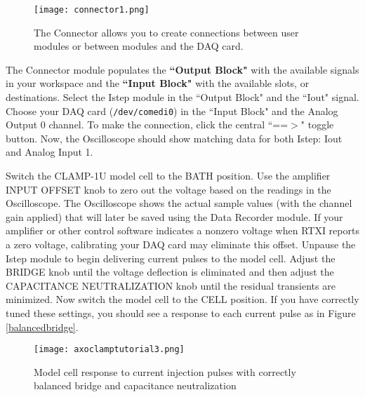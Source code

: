 \begin{figure}[h]
\begin{center}
\texttt{[image: connector1.png]} 
\caption[Connector]{The Connector allows you to create connections between user modules or between modules and the DAQ card.} 
\end{center}
\end{figure}

The Connector module populates the \textbf{``Output Block"} with the available signals in your workspace and the \textbf{``Input Block"} with the available slots, or destinations. Select the Istep module in the ``Output Block" and the ``Iout" signal. Choose your DAQ card (\texttt{/dev/comedi0}) in the ``Input Block" and the Analog Output 0 channel. To make the connection, click the central ``==$>$" toggle button. Now, the Oscilloscope should show matching data for both Istep: Iout and Analog Input 1.

\vspace{1cm}
Switch the CLAMP-1U model cell to the BATH position. Use the amplifier INPUT OFFSET knob to zero out the voltage based on the readings in the Oscilloscope. The Oscilloscope shows the actual sample values (with the channel gain applied) that will later be saved using the Data Recorder module. If your amplifier or other control software indicates a nonzero voltage when RTXI reports a zero voltage, calibrating your DAQ card may eliminate this offset. Unpause the Istep module to begin delivering current pulses to the model cell. Adjust the BRIDGE knob until the voltage deflection is eliminated and then adjust the CAPACITANCE NEUTRALIZATION knob until the residual transients are minimized. Now switch the model cell to the CELL position. If you have correctly tuned these settings, you should see a response to each current pulse as in Figure \ref{balancedbridge}.

\begin{figure}[h!]
\begin{maxipage}
\begin{center}
\texttt{[image: axoclamptutorial3.png]} 
\caption[Axoclamp Tutorial: Balanced Bridge]{Model cell response to current injection pulses with correctly balanced bridge and capacitance neutralization}
\label{fig:balancedbridge}
\end{center}
\end{maxipage}
\end{figure}

